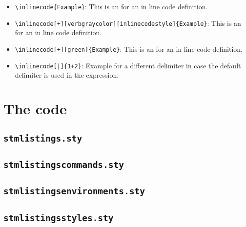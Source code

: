 \documentclass[%
  type=article,%
  layout=koma,%
  hyperref=true,%
  date=true,%
  listings=false,%
  tabular=true,%
]{stmtext}
\begin{document}
\begin{itemize}
  \item \verb|\inlinecode{Example}|: This is an  for an in line code definition.
  \item \verb|\inlinecode[+][verbgraycolor][inlinecodestyle]{Example}|: This is an  for an in line code definition.
  \item \verb|\inlinecode[+][green]{Example}|: This is an  for an in line code definition.
  \item \verb#\inlinecode[|]{1+2}#: Example for a different delimiter  in case the default delimiter is used in the expression.
\end{itemize}

\newpage
\appendix

\section{The code}

\subsection{\protect\texttt{stmlistings.sty}}



% 
% 

\newpage
\subsection{\protect\texttt{stmlistingscommands.sty}}



\newpage
\subsection{\protect\texttt{stmlistingsenvironments.sty}}



\newpage
\subsection{\protect\texttt{stmlistingsstyles.sty}}


\end{document}
